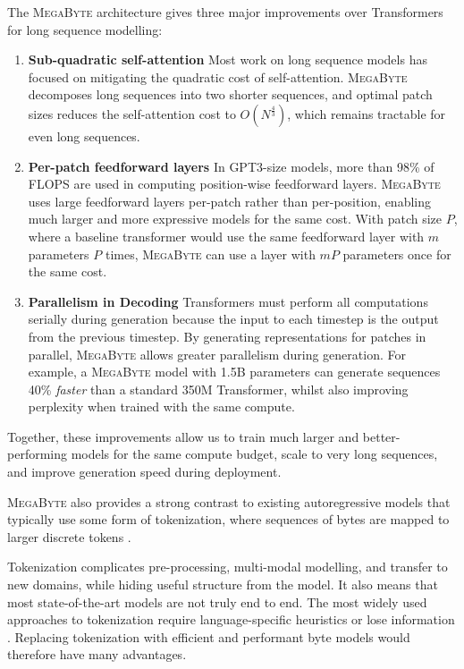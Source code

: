 The \textsc{MegaByte} architecture gives three major improvements over Transformers for long sequence modelling:

\begin{enumerate}
    \item \textbf{Sub-quadratic self-attention} Most work on long sequence models has focused on mitigating the quadratic cost of self-attention. \textsc{MegaByte} decomposes long sequences into two shorter sequences, and optimal patch sizes reduces the self-attention cost to $O(N^{\frac{4}{3}})$, which remains tractable for even long sequences.
    \item \textbf{Per-patch feedforward layers} In GPT3-size models, more than 98\% of FLOPS are used in computing position-wise feedforward layers. \textsc{MegaByte} uses large feedforward layers per-patch rather than per-position, enabling much larger and more expressive models for the same cost. With patch size $P$, where a baseline transformer would use the same feedforward layer with $m$ parameters $P$ times, \textsc{MegaByte} can use a layer with $mP$ parameters once for the same cost.
    \item \textbf{Parallelism in Decoding} Transformers must perform all computations serially during generation because the input to each timestep is the output from the previous timestep. By generating representations for patches in parallel, \textsc{MegaByte} allows greater parallelism during generation. For example, a \textsc{MegaByte} model with 1.5B parameters can generate sequences 40\% \emph{faster} than a standard 350M Transformer, whilst also improving perplexity when trained with the same compute. 
\end{enumerate}

Together, these improvements allow us to train much larger and better-performing models for the same compute budget, scale to very long sequences, and improve generation speed during deployment.

\textsc{MegaByte} also provides a strong contrast to existing autoregressive models that typically use some form of tokenization, where sequences of bytes are mapped to larger discrete tokens \citep{bpe,dalle,hubert}.

Tokenization complicates pre-processing, multi-modal modelling, and transfer to new domains, while hiding useful structure from the model. It also means that most state-of-the-art models are not truly end to end. The most widely used approaches to tokenization require language-specific heuristics \citep{gpt2} or lose information \citep{dalle}. Replacing tokenization with efficient and performant byte models would therefore have many advantages.

